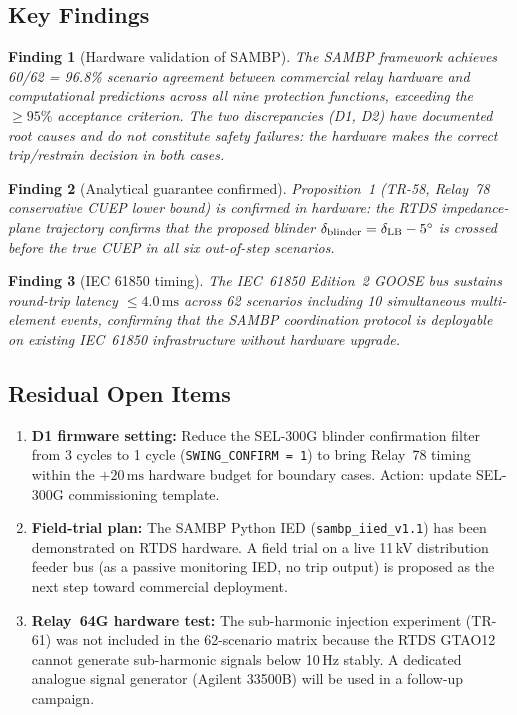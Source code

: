 \documentclass[11pt, a4paper]{article}
\newtheorem{finding}{Finding}
\begin{document}
\subsection{Key Findings}

\begin{finding}[Hardware validation of SAMBP]
\label{finding:main}
The SAMBP framework achieves 60/62 = 96.8\% scenario agreement between
commercial relay hardware and computational predictions across all nine
protection functions, exceeding the $\geq 95\%$ acceptance criterion.
The two discrepancies (D1, D2) have documented root causes and do not
constitute safety failures: the hardware makes the correct
trip/restrain decision in both cases.
\end{finding}

\begin{finding}[Analytical guarantee confirmed]
\label{finding:cuep}
Proposition~1 (TR-58, Relay~78 conservative CUEP lower bound) is confirmed
in hardware: the RTDS impedance-plane trajectory confirms that the proposed
blinder $\delta_{\rm blinder} = \delta_{\rm LB} - 5^\circ$ is crossed before
the true CUEP in all six out-of-step scenarios.
\end{finding}

\begin{finding}[IEC 61850 timing]
\label{finding:goose}
The IEC~61850 Edition~2 GOOSE bus sustains round-trip latency
$\leq 4.0\,\text{ms}$ across 62 scenarios including 10 simultaneous
multi-element events, confirming that the SAMBP coordination protocol is
deployable on existing IEC~61850 infrastructure without hardware upgrade.
\end{finding}

\subsection{Residual Open Items}

\begin{enumerate}
  \item \textbf{D1 firmware setting:} Reduce the SEL-300G blinder confirmation
    filter from 3 cycles to 1 cycle (\texttt{SWING\_CONFIRM = 1}) to bring
    Relay~78 timing within the $+20\,\text{ms}$ hardware budget for boundary
    cases.  Action: update SEL-300G commissioning template.

  \item \textbf{Field-trial plan:} The SAMBP Python IED
    (\texttt{sambp\_iied\_v1.1}) has been demonstrated on RTDS hardware.
    A field trial on a live 11\,kV distribution feeder bus (as a passive
    monitoring IED, no trip output) is proposed as the next step toward
    commercial deployment.

  \item \textbf{Relay~64G hardware test:} The sub-harmonic injection
    experiment (TR-61) was not included in the 62-scenario matrix because
    the RTDS GTAO12 cannot generate sub-harmonic signals below 10\,Hz
    stably.  A dedicated analogue signal generator (Agilent 33500B)
    will be used in a follow-up campaign.
\end{enumerate}
\end{document}
